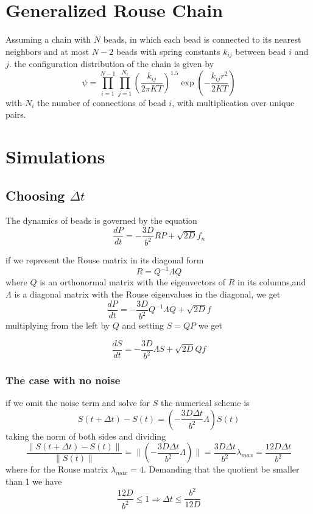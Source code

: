 \documentclass{report}
\begin{document}
\section{Generalized Rouse Chain}\label{section_generalizedRouseChain}
Assuming a chain with $N$ beads, in which each bead is connected to its nearest neighbors and at most $N-2$ beads with spring constants $k_{ij}$ between bead $i$ and $j$. the configuration distribution of the chain is given by 
\begin{equation*}
\psi = \prod_{i=1}^{N-1}\prod_{j=1}^{N_i}\left(\frac{k_{ij}}{2\pi KT}\right)^{1.5}\exp\left(-\frac{k_{ij}r^2}{2KT}\right)
\end{equation*}
with $N_i$ the number of connections of bead $i$, with multiplication over unique pairs. 

\section{Simulations}
\subsection{Choosing $\Delta t$}
The dynamics of beads is governed by the equation
\begin{equation*}
\frac{dP}{dt} = -\frac{3D}{b^2}RP+\sqrt{2D}f_n
\end{equation*}

if we represent the Rouse matrix in its diagonal form 
\begin{equation*}
R=Q^{-1}\Lambda Q
\end{equation*}
where $Q$ is an orthonormal matrix with the eigenvectors of $R$ in its columns,and $\Lambda$ is a diagonal matrix with the Rouse eigenvalues in the diagonal, we get 
\begin{equation*}
\frac{dP}{dt} = -\frac{3D}{b^2}Q^{-1}\Lambda Q+\sqrt{2D}f
\end{equation*}
multiplying from the left by $Q$ and setting $S=QP$ we get 

\begin{equation*}
\frac{dS}{dt}=-\frac{3D}{b^2}\Lambda S+\sqrt{2D}Qf
\end{equation*}
\subsubsection{The case with no noise}
if we omit the noise term and solve for $S$ 
the numerical scheme is 
\begin{equation*}
S(t+\Delta t)-S(t)=(-\frac{3D\Delta t}{b^2}\Lambda)S(t)
\end{equation*}
taking the norm of both sides and dividing 
\begin{equation*}
\frac{\|S(t+\Delta t)-S(t)\|}{\|S(t)\|}=\|(-\frac{3D\Delta t}{b^2}\Lambda)\| = \frac{3D\Delta t}{b^2}\lambda_{max}= \frac{12D\Delta t}{b^2}
\end{equation*}
where for the Rouse matrix $\lambda_{max} = 4$.  Demanding that the quotient be smaller than 1 we have 
\begin{equation*}
 \frac{12D}{b^2}\leq1 \Longrightarrow \Delta t \leq \frac{b^2}{12D}
 \end{equation*}
\end{document}
